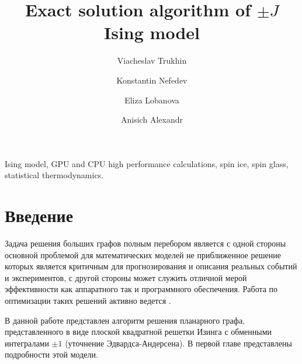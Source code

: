 \documentclass[utf8, babel, sor, jor, amsmath, amssymb, reprint]{elsarticle} %
\begin{document}
	
	\begin{frontmatter}
		
		
		\title{Exact solution algorithm of $\pm J$ Ising model}
		
		\author[mainaddress, secondaryaddress]{Viacheslav Trukhin}
		
		\author[mainaddress, secondaryaddress]{Konstantin Nefedev}
		
		\author[mainaddress, secondaryaddress]{Eliza Lobanova}
		
		\author[mainaddress, secondaryaddress]{Anisich Alexandr}
		
		\address[mainaddress]{Far Eastern Federal University, Vladivostok, Russky Island, 10 Ajax Bay, 690922, the Russian Federation}
		\address[secondaryaddress]{Institute of Applied Mathematics, Far Eastern Branch, Russian Academy of Science, Vladivostok, Radio 7, 690041, the Russian Federation}
		
		\begin{abstract}
			
			
		\end{abstract}
		
		
		\begin{keyword}
			Ising model, GPU and CPU high performance calculations, spin ice, spin glass, statistical thermodynamics.
			
		\end{keyword}
		
		
	\end{frontmatter}
	
	\linenumbers
	\newpage
	\tableofcontents
	
	\newpage
	\section{Введение}
	
	Задача решения больших графов полным перебором является с одной стороны основной проблемой для математических моделей не приближенное решение которых является критичным для прогнозирования и описания реальных событий и экспериментов, с другой стороны может служить отличной мерой эффективности как аппаратного так и программного обеспечения. Работа по оптимизации таких решений активно ведется \cite{romero2020high}. 
	
	В данной работе представлен алгоритм решения планарного графа, представленного в виде плоской квадратной решетки Изинга с обменными интегралами $\pm 1$ (уточнение Эдвардса-Андерсена). В первой главе представлены подробности этой модели.
	
\end{document}
